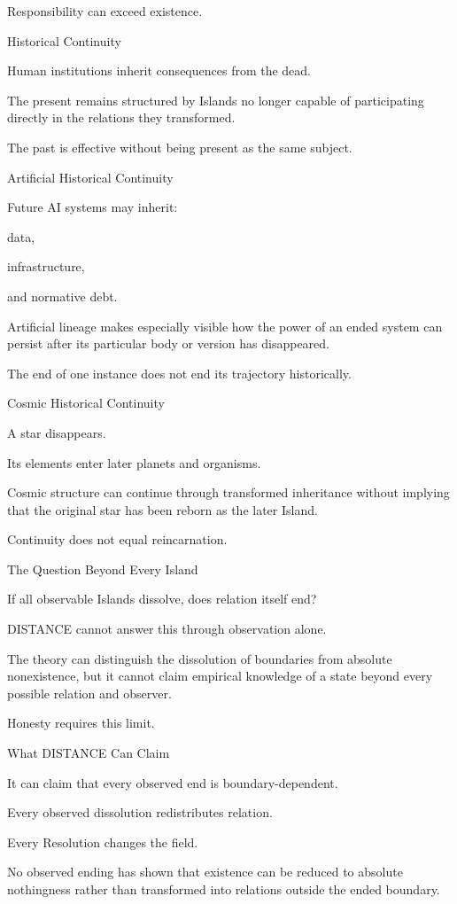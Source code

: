 Responsibility can exceed existence.

Historical Continuity

Human institutions inherit consequences from the dead.

The present remains structured by Islands no longer capable of participating directly in the relations they transformed.

The past is effective without being present as the same subject.

Artificial Historical Continuity

Future AI systems may inherit:

data,

infrastructure,

and normative debt.

Artificial lineage makes especially visible how the power of an ended system can persist after its particular body or version has disappeared.

The end of one instance does not end its trajectory historically.

Cosmic Historical Continuity

A star disappears.

Its elements enter later planets and organisms.

Cosmic structure can continue through transformed inheritance without implying that the original star has been reborn as the later Island.

Continuity does not equal reincarnation.

The Question Beyond Every Island

If all observable Islands dissolve, does relation itself end?

DISTANCE cannot answer this through observation alone.

The theory can distinguish the dissolution of boundaries from absolute nonexistence, but it cannot claim empirical knowledge of a state beyond every possible relation and observer.

Honesty requires this limit.

What DISTANCE Can Claim

It can claim that every observed end is boundary-dependent.

Every observed dissolution redistributes relation.

Every Resolution changes the field.

No observed ending has shown that existence can be reduced to absolute nothingness rather than transformed into relations outside the ended boundary.

